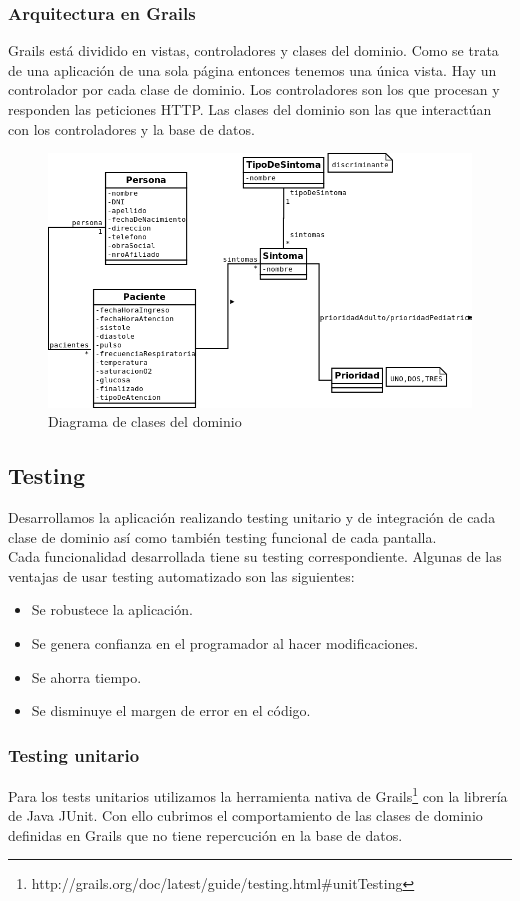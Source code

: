 \subsubsection{Arquitectura en Grails}
Grails está dividido en vistas, controladores y clases del dominio. Como se trata de una aplicación de una sola página entonces tenemos una única vista. Hay un controlador por cada clase de dominio. Los controladores son los que procesan y responden las peticiones HTTP. Las clases del dominio son las que interactúan con los controladores y la base de datos.
\begin{figure}[h]
\centerline{\includegraphics[width=1.2\textwidth]{triage.png}}
\caption{Diagrama de clases del dominio}
\end{figure}

\subsection{Testing}
Desarrollamos la aplicación realizando testing unitario y de integración de cada clase de dominio así como también testing funcional de cada pantalla.\\
Cada funcionalidad desarrollada tiene su testing correspondiente. Algunas de las ventajas de usar testing automatizado son las siguientes:
\begin{itemize}
\item Se robustece la aplicación.
\item Se genera confianza en el programador al hacer modificaciones.
\item Se ahorra tiempo.
\item Se disminuye el margen de error en el código.
\end{itemize}

\subsubsection{Testing unitario}
Para los tests unitarios utilizamos la herramienta nativa de Grails\footnote{http://grails.org/doc/latest/guide/testing.html\#unitTesting} con la librería de Java JUnit. Con ello cubrimos el comportamiento de las clases de dominio definidas en Grails que no tiene repercución en la base de datos.

